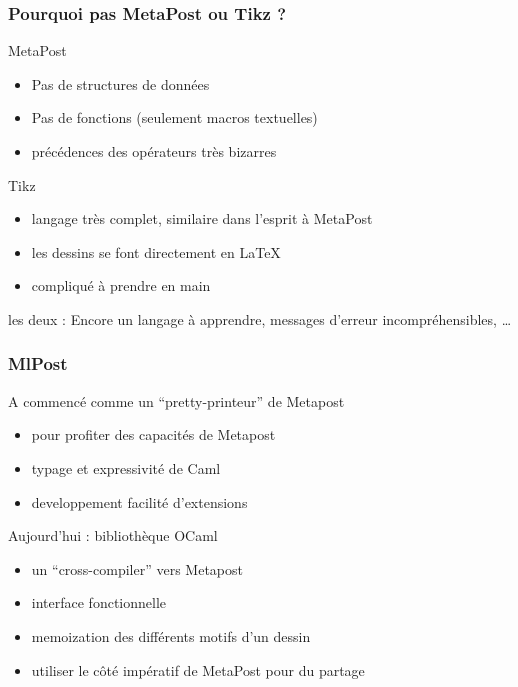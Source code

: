 \documentclass[nodefaultblocks]{beamer}
\begin{document}
\begin{frame}\frametitle{Pourquoi pas MetaPost ou Tikz ?}
  \begin{block}{MetaPost}
    \begin{itemize}
      \item Pas de structures de données
      \item Pas de fonctions (seulement macros textuelles) 
      \item précédences des opérateurs très bizarres
    \end{itemize}
  \end{block}
  \begin{block}{Tikz}
    \begin{itemize}
      \item langage très complet, similaire dans l'esprit à MetaPost
      \item les dessins se font directement en \LaTeX
      \item compliqué à prendre en main 
    \end{itemize}
  \end{block}

  \medskip

  les deux : Encore un langage à apprendre, messages d'erreur
  incompréhensibles, \dots
\end{frame}

\begin{frame}\frametitle{MlPost}
  \begin{block}{A commencé comme un ``pretty-printeur'' de Metapost}
    \begin{itemize}
      \item pour profiter des capacités de Metapost 
      \item typage et expressivité de Caml
      \item developpement facilité d'extensions
    \end{itemize}
  \end{block}

  \begin{block}{Aujourd'hui : bibliothèque OCaml}
    \begin{itemize}
      \item un ``cross-compiler'' vers Metapost
      \item interface fonctionnelle
      \item memoization des différents motifs d'un dessin
      \item utiliser le côté impératif de MetaPost pour du partage
    \end{itemize}
  \end{block}

\end{frame}
\end{document}
